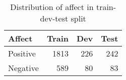 \begin{table}[t]
	\centering
	\begin{tabular}{lrrr}
		\toprule
		\textbf{Affect} & \textbf{Train} & \textbf{Dev} & \textbf{Test} \\ \midrule
		Positive & 1813 & 226 & 242\\
        Negative & 589 & 80 & 83\\
        \bottomrule
	\end{tabular}
	\caption{Distribution of affect in train-dev-test split}
	\label{tab:affect-traindevtestsplit}
\end{table}
